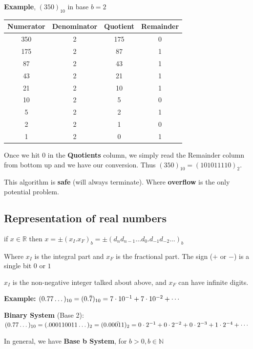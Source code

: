 \documentclass{article}
\begin{document}
\textbf{Example}, $(350)_{10}$ in base $b = 2$

\begin{center}
\begin{tabular}{c|c|c|c}
    Numerator & Denominator & Quotient & Remainder\\
    \hline
    350 & 2 & 175 & 0\\
    175 & 2 & 87 & 1\\
    87 & 2 & 43 & 1\\
    43 & 2 & 21 & 1\\
    21 & 2 & 10 & 1\\
    10 & 2 & 5 & 0\\
    5 & 2 & 2 & 1\\
    2 & 2 & 1 & 0\\
    1 & 2 &  0 & 1
\end{tabular}
\end{center}

Once we hit $0$ in the \textbf{Quotients} column, we simply read the Remainder column from bottom up and we have our conversion. Thus $(350)_{10} = (101011110)_{2}$. 

This algorithm is \textbf{safe} (will always terminate). Where \textbf{overflow} is the only potential problem.

\subsection{Representation of real numbers}

if $x \in \mathbb R$ then $x = \pm (x_I . x_F)_{b} = \pm(d_n d_{n - 1} \dots d_0 . d_{-1} d_{-2} \dots )_{b}$

Where $x_I$ is the integral part and $x_F$ is the fractional part. The sign ($+$ or $-$) is a single bit $0$ or $1$

$x_I$ is the non-negative integer talked about above, and $x_F$ can have infinite digits.

\vspace{0.cm}

\textbf{Example:} $(0.77 \dots)_{10} = (0.\Bar{7})_{10} = 7 \cdot 10^{-1} + 7 \cdot 10^{-2} + \cdots $

\vspace{0.1cm}

\textbf{Binary System} (Base 2): $(0.77 \dots)_{10} = (.000110011 \dots )_{2} = (0.0\Bar{0011})_{2} = 0\cdot 2^{-1} + 0 \cdot 2^{-2} + 0 \cdot 2^{-3} + 1 \cdot 2^{-4} + \cdots$

In general, we have \textbf{Base b System}, for $b > 0, b \in \mathbb N$ 
\end{document}
